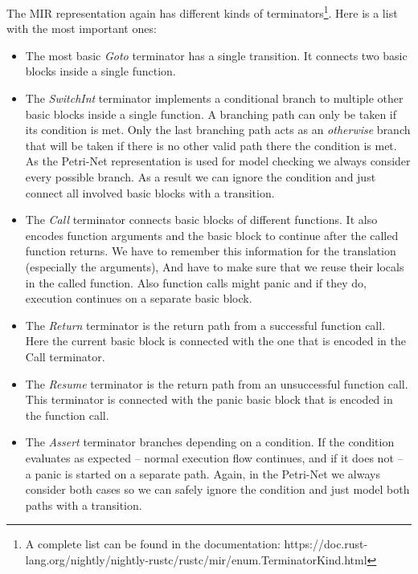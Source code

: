 The MIR representation again has different kinds of terminators\footnote{A complete list can be found in the documentation: https://doc.rust-lang.org/nightly/nightly-rustc/rustc/mir/enum.TerminatorKind.html}. Here is a list with the most important ones:
\begin{itemize}
    \item The most basic \textit{Goto} terminator has a single transition.
    It connects two basic blocks inside a single function.
    \item The \textit{SwitchInt} terminator implements a conditional branch to multiple other basic blocks inside a single function.
    A branching path can only be taken if its condition is met.
    Only the last branching path acts as an \textit{otherwise} branch that will be taken if there is no other valid path there the condition is met.
    As the Petri-Net representation is used for model checking we always consider every possible branch.
    As a result we can ignore the condition and just connect all involved basic blocks with a transition.
    \item The \textit{Call} terminator connects basic blocks of different functions.
    It also encodes function arguments and the basic block to continue after the called function returns.
    We have to remember this information for the translation (especially the arguments),
    And have to make sure that we reuse their locals in the called function.
    Also function calls might panic and if they do, execution continues on a separate basic block.
    \item The \textit{Return} terminator is the return path from a successful function call.
    Here the current basic block is connected with the one that is encoded in the Call terminator.
    \item The \textit{Resume} terminator is the return path from an unsuccessful function call.
    This terminator is connected with the panic basic block that is encoded in the function call.
    \item The \textit{Assert} terminator branches depending on a condition.
    If the condition evaluates as expected -- normal execution flow continues, and if it does not -- a panic is started on a separate path.
    Again, in the Petri-Net we always consider both cases so we can safely ignore the condition and just model both paths with a transition.
\end{itemize}

